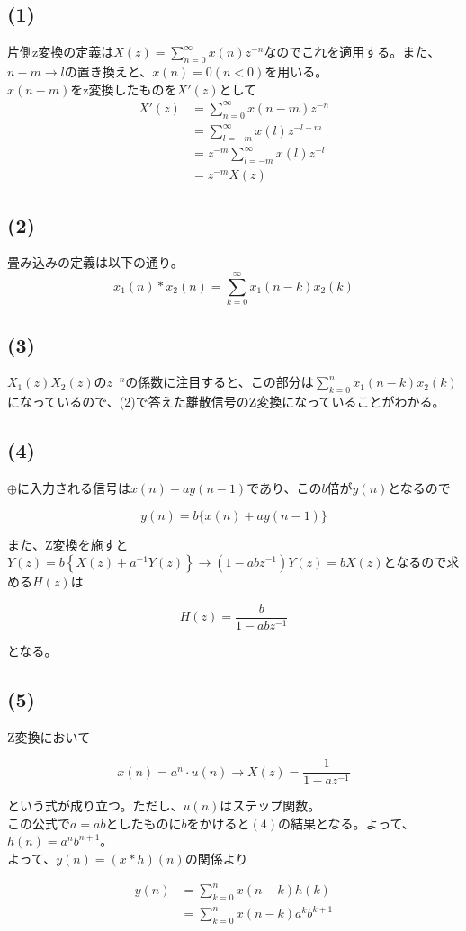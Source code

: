 \documentclass[a4paper,12pt,xelatex,ja=standard]{bxjsarticle}
\begin{document}
\subsection*{(1)}
片側z変換の定義は$X(z) = \sum^{\infty}_{n = 0} x(n)z^{-n}$なのでこれを適用する。また、$n-m \to l$の置き換えと、$x(n)=0(n<0)$を用いる。\\
$x(n-m)$をz変換したものを$X'(z)$として
\begin{equation*}
  \begin{split}
    X'(z)
      &= \sum^{\infty}_{n=0} x(n-m) z^{-n} \\
      &= \sum^{\infty}_{l=-m} x(l) z^{-l-m} \\
      &= z^{-m} \sum^{\infty}_{l=-m} x(l) z^{-l} \\
      &= z^{-m} X(z)
  \end{split}
\end{equation*}

\subsection*{(2)}
畳み込みの定義は以下の通り。
\[
  x_1(n) * x_2(n) = \sum^{\infty}_{k=0}x_1(n-k)x_2(k)
\]

\subsection*{(3)}
$X_1(z)X_2(z)$の$z^{-n}$の係数に注目すると、この部分は$\sum^{n}_{k=0}x_1(n-k)x_2(k)$になっているので、(2)で答えた離散信号のZ変換になっていることがわかる。

\subsection*{(4)}
$\oplus$に入力される信号は$x(n) + ay(n-1)$であり、この$b$倍が$y(n)$となるので

\[
  y(n) = b\{x(n) + ay(n-1)\}
\]

また、Z変換を施すと$Y(z) = b\left\{ X(z) + a^{-1}Y(z)\right\} \to (1 - abz^{-1})Y(z) = bX(z)$となるので求める$H(z)$は

\[
  H(z) = \frac{b}{1 - abz^{-1}}
\]

となる。

\subsection*{(5)}
Z変換において

\[
  x(n) = a^{n} \cdot u(n) \to X(z) = \frac{1}{1 - az^{-1}}
\]

という式が成り立つ。ただし、$u(n)$はステップ関数。\\
この公式で$a=ab$としたものに$b$をかけると$(4)$の結果となる。よって、$h(n)=a^{n}b^{n+1}$。\\

よって、$y(n) = (x * h)(n)$の関係より

\begin{equation*}
  \begin{split}
    y(n)
      &= \sum^{n}_{k=0}x(n-k)h(k) \\
      &= \sum^{n}_{k=0}x(n-k) a^{k}b^{k+1}
  \end{split}
\end{equation*}
\end{document}
